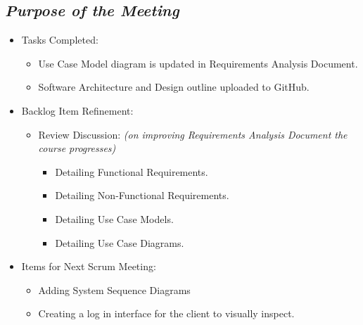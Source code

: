 \documentclass[a4paper]{article}
\begin{document}
\subsection{\textit{Purpose of the Meeting}}

\begin{itemize}

\item Tasks Completed:

\begin{itemize}

\item Use Case Model diagram is updated in Requirements Analysis Document.

\item Software Architecture and Design outline uploaded to GitHub.

\end{itemize}

\item Backlog Item Refinement:

\begin{itemize}

\item Review Discussion: \emph{(on improving Requirements Analysis Document the course progresses)}

\begin{itemize}

\item Detailing Functional Requirements.

\item Detailing Non-Functional Requirements.

\item Detailing Use Case Models.

\item Detailing Use Case Diagrams.

\end{itemize}

\end{itemize}

\item Items for Next Scrum Meeting:

\begin{itemize}

\item Adding System Sequence Diagrams

\item Creating a log in interface for the client to visually inspect.

\end{itemize}


\end{itemize}
\end{document}
